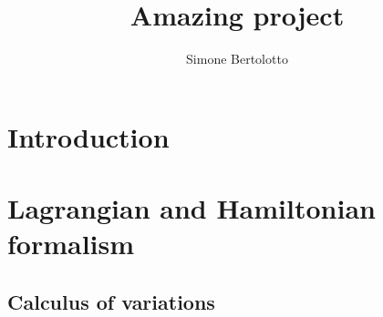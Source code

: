 \documentclass[a4paper]{article}
\title{Amazing project}
\author{Simone Bertolotto}
\theoremstyle{definition}
\numberwithin{equation}{section}
\begin{document}
  \maketitle
  \newpage

  \begin{abstract}
    \lipsum[1]
  \end{abstract}

  \newpage

  \section{Introduction}
  

  \section{Lagrangian and Hamiltonian formalism}
  

  \newpage
  \begin{appendices}
    \section{Calculus of variations} \label{appendix: calculus of variation}
    
  \end{appendices}

  \newpage
  \printbibliography
\end{document}
